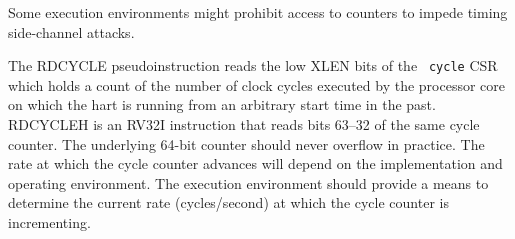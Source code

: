 \begin{commentary}
Some execution environments might prohibit access to counters to
impede timing side-channel attacks.
\end{commentary}

The RDCYCLE pseudoinstruction reads the low XLEN bits of the {\tt
  cycle} CSR which holds a count of the number of clock cycles
executed by the processor core on which the hart is running from an
arbitrary start time in the past.  RDCYCLEH is an RV32I
instruction that reads bits 63--32 of the same cycle counter.  The
underlying 64-bit counter should never overflow in practice.  The rate
at which the cycle counter advances will depend on the implementation
and operating environment.  The execution environment should provide a
means to determine the current rate (cycles/second) at which the cycle
counter is incrementing.

